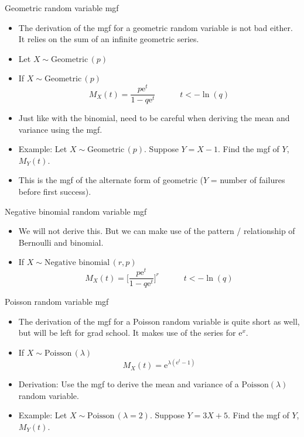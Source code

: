 \documentclass{article}
\newcommand{\follow}[1]{\sim \text{#1}\,}		%
\newcommand{\e}{\mathrm{e}}		%
\begin{document}
Geometric random variable mgf\bigskip
\begin{itemize}
    \item The derivation of the mgf for a geometric random variable is not bad either. It relies on the sum of an infinite geometric series.
    \item Let $X \follow{Geometric}(p)$\vspace{130pt}
    \item If $X \follow{Geometric}(p)$
    \[M_X(t) = \frac{p\e^t}{1 - q\e^t} \quad\quad\quad t < -\ln(q)\]
    \item Just like with the binomial, need to be careful when deriving the mean and variance using the mgf.
    \item Example: Let $X \follow{Geometric}(p)$. Suppose $Y = X - 1$. Find the mgf of $Y$, $M_Y(t)$.\vspace{100pt}
    \item[] This is the mgf of the alternate form of geometric ($Y$ = number of failures before first success).
\end{itemize}\bigskip

Negative binomial random variable mgf\bigskip
\begin{itemize}
    \item We will not derive this. But we can make use of the pattern / relationship of Bernoulli and binomial.\vspace{100pt}
    \item If $X \follow{Negative binomial}(r, p)$
    \[M_X(t) = \bigg[\frac{p\e^t}{1 - q\e^t}\bigg]^r \quad\quad\quad t < -\ln(q)\]
\end{itemize}\bigskip

Poisson random variable mgf\bigskip
\begin{itemize}
    \item The derivation of the mgf for a Poisson random variable is quite short as well, but will be left for grad school. It makes use of the series for $\e^x$.
    \item If $X \follow{Poisson}(\lambda)$
    \[M_X(t) = \e^{\lambda (\e^t - 1)}\]
    \item Derivation: Use the mgf to derive the mean and variance of a $\text{Poisson}(\lambda)$ random variable.\vspace{400pt}
    \item Example: Let $X \follow{Poisson}(\lambda = 2)$. Suppose $Y = 3X + 5$. Find the mgf of $Y$, $M_Y(t)$.\vspace{80pt}
\end{itemize}\bigskip
\end{document}
